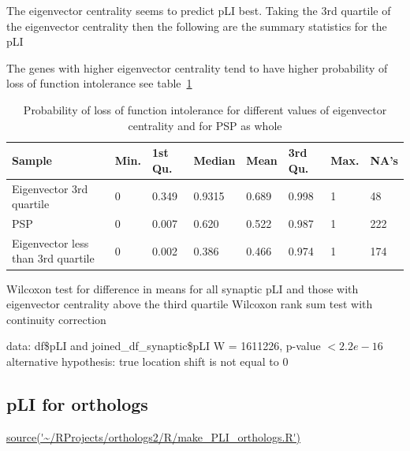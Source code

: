 The eigenvector centrality seems to predict pLI best. Taking the 3rd quartile of the eigenvector centrality then the following are the summary statistics for the pLI

The genes with higher eigenvector centrality tend to have higher probability of loss of function intolerance see table~\ref{tab:pli and eigenvector centrality quartiles}

\begin{table}[]
    \centering
    \begin{tabular}{llllllll}
    \toprule
      Sample &  Min. &1st Qu.&  Median &   Mean& 3rd Qu.&    Max. &   NA's     \\
      \midrule
     Eigenvector 3rd quartile  &0& 0.349& 0.9315& 0.689& 0.998& 1&     48  \\ 
     PSP &0&0.007&0.620&0.522&0.987&  1 & 222\\
     Eigenvector less than 3rd quartile &0&0.002&0.386&0.466&0.974&1&    174\\
     \bottomrule
    \end{tabular}
    \caption{Probability of loss of function intolerance for different values of eigenvector centrality and for PSP as whole}
    \label{tab:pli and eigenvector centrality quartiles}
\end{table}




Wilcoxon test for difference in means for all synaptic pLI and those with eigenvector centrality above the third quartile
        Wilcoxon rank sum test with continuity correction

data:  df\$pLI and joined\_df\_synaptic\$pLI
W = 1611226, p-value $< 2.2e-16$
alternative hypothesis: true location shift is not equal to 0


\subsection{pLI for orthologs} \url{source('~/RProjects/orthologs2/R/make_PLI_orthologs.R')}

